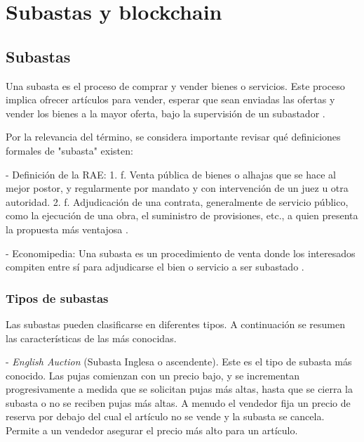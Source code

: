 \chapter{Subastas y blockchain}\label{chapter:chapter1}

\hspace*{}

\section{Subastas}
  
  \hspace*{}

  Una subasta es el proceso de comprar y vender bienes o servicios. Este proceso implica ofrecer artículos 
  para vender, esperar que sean enviadas las ofertas y vender los bienes a la mayor oferta, bajo la supervisión
  de un subastador \parencite{krishna}.


  Por la relevancia del término, se considera importante revisar qué definiciones formales de "subasta" existen:

  - Definición de la RAE: %
  1. f. Venta pública de bienes o alhajas que se hace al mejor postor, y regularmente por mandato y con intervención de un juez u otra 
  autoridad.
  2. f. Adjudicación de una contrata, generalmente de servicio público, como la ejecución de una obra, el suministro de provisiones, etc., 
  a quien presenta la propuesta más ventajosa \parencite{raesubasta}.

  - Economipedia:
  Una subasta es un procedimiento de venta donde los interesados compiten entre sí para adjudicarse el bien o servicio a ser subastado 
  \parencite{economipediasubasta}.

  \subsection{Tipos de subastas} \hspace*{}

    Las subastas pueden clasificarse en diferentes tipos. A continuación se resumen las características de las más conocidas.

    - \textit{English Auction} (Subasta Inglesa o ascendente). Este es el tipo de subasta más conocido. Las pujas comienzan con un precio bajo, y se 
    incrementan progresivamente a medida que se solicitan pujas más altas, hasta que se cierra la subasta o 
    no se reciben pujas más altas. A menudo el vendedor fija un precio de reserva por debajo del cual el 
    artículo no se vende y la subasta se cancela. Permite a un vendedor asegurar el precio más alto para un 
    artículo.

